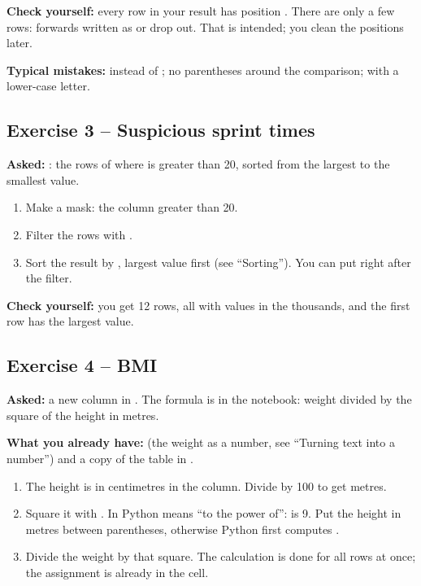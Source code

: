\documentclass[11pt,a4paper]{article}
\begin{document}
\textbf{Check yourself:} every row in your result has position
. There are only a few rows: forwards written as
 or  drop out. That is intended; you clean the
positions later.

\textbf{Typical mistakes:}  instead of \code{\&}; no parentheses
around the comparison;  with a lower-case letter.

\subsection*{Exercise 3 -- Suspicious sprint times}

\textbf{Asked:} : the rows of 
where  is greater than 20, sorted from the largest to
the smallest value.

\begin{enumerate}
  \item Make a mask: the  column greater than 20.
  \item Filter the rows with .
  \item Sort the result by , largest value first (see
        ``Sorting''). You can put  right after the
        filter.
\end{enumerate}

\textbf{Check yourself:} you get 12 rows, all with values in the
thousands, and the first row has the largest value.

\subsection*{Exercise 4 -- BMI}

\textbf{Asked:} a new column  in . The
formula is in the notebook: weight divided by the square of the height in
metres.

\textbf{What you already have:}  (the weight as a
number, see ``Turning text into a number'') and a copy of the table in
.

\begin{enumerate}
  \item The height is in centimetres in the  column.
        Divide by 100 to get metres.
  \item Square it with . In Python \code{**} means ``to the
        power of'':  is 9. Put the height in metres between
        parentheses, otherwise Python first computes .
  \item Divide the weight by that square. The calculation is done for all
        rows at once; the assignment  is already in
        the cell.
\end{enumerate}
\end{document}
